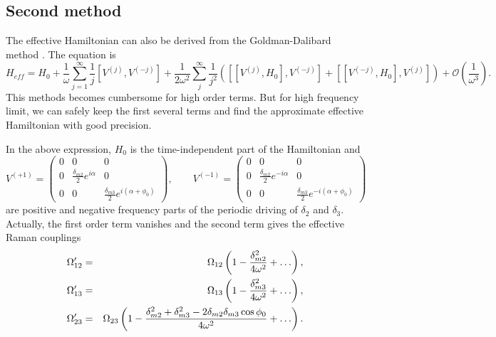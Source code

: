 \documentclass[aps,prl,twocolumn,floatfix,reprint]{revtex4}
\begin{document}
\begin{widetext}
\subsection{Second method}

The effective Hamiltonian can also be derived from the Goldman-Dalibard
method \cite{Goldman2014}. The equation is
\begin{equation}
H_{eff}=H_{0}+\frac{1}{\omega }\sum_{j=1}^{\infty }\frac{1}{j}%
[V^{(j)},V^{(-j)}]+\frac{1}{2\omega ^{2}}\sum_{j}^{\infty }\frac{1}{j^{2}}%
\left( [[V^{(j)},H_{0}],V^{(-j)}]+[[V^{(-j)},H_{0}],V^{(j)}]\right) +%
\mathcal{O}\left( \frac{1}{\omega ^{3}}\right) .
\end{equation}%
This methods becomes cumbersome for high order terms. But for high frequency
limit, we can safely keep the first several terms and find the approximate
effective Hamiltonian with good precision.

In the above expression, $H_{0}$ is the time-independent part of the
Hamiltonian and
\begin{equation}
V^{(+1)}=\left(
\begin{array}{ccc}
0 & 0 & 0 \\
0 & \frac{\delta _{m2}}{2}e^{i\alpha } & 0 \\
0 & 0 & \frac{\delta _{m3}}{2}e^{i(\alpha +\phi _{0})}%
\end{array}%
\right) ,\qquad V^{(-1)}=\left(
\begin{array}{ccc}
0 & 0 & 0 \\
0 & \frac{\delta _{m2}}{2}e^{-i\alpha } & 0 \\
0 & 0 & \frac{\delta _{m3}}{2}e^{-i(\alpha +\phi _{0})}%
\end{array}%
\right)
\end{equation}%
are positive and negative frequency parts of the periodic driving of $\delta
_{2}$ and $\delta _{3}$. Actually, the first order term vanishes and the
second term gives the effective Raman couplings
\begin{eqnarray}
\Omega _{12}^{\prime } &=&\Omega _{12}\left( 1-\frac{\delta _{m2}^{2}}{%
4\omega ^{2}}+\ldots \right) , \\
\Omega _{13}^{\prime } &=&\Omega _{13}\left( 1-\frac{\delta _{m3}^{2}}{%
4\omega ^{2}}+\ldots \right) , \\
\Omega _{23}^{\prime } &=&\Omega _{23}\left( 1-\frac{\delta _{m2}^{2}+\delta
_{m3}^{2}-2\delta _{m2}\delta _{m3}\cos \phi _{0}}{4\omega ^{2}}+\ldots
\right) .
\end{eqnarray}


\end{widetext}
\end{document}
